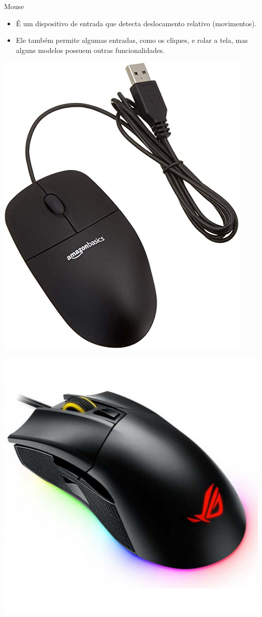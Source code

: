 \begin{frame}{Mouse}
	\begin{block}{}
		\begin{itemize}
			\item É um dispositivo de entrada que detecta deslocamento relativo (movimentos).
			\item Ele também permite algumas entradas, como os cliques, e rolar a tela, mas alguns modelos possuem outras funcionalidades.
		\end{itemize}
	\end{block}

	\begin{minipage}{0.49\linewidth}
		\centering
		\includegraphics[width=0.7\linewidth]{Figuras/Ch02/fig12}
	\end{minipage}
	\hfill
	\begin{minipage}{0.49\linewidth}
		\centering
		\includegraphics[width=0.7\linewidth]{Figuras/Ch02/fig13}
	\end{minipage}
\end{frame}


